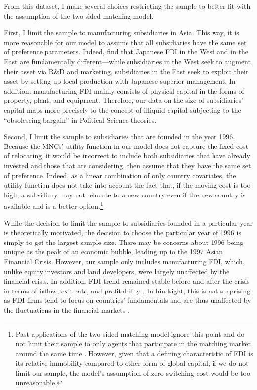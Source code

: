 From this dataset, I make several choices restricting the sample to better fit
with the assumption of the two-sided matching model.

First, I limit the sample to manufacturing subsidiaries in Asia. This way, it is
more reasonable
for our model to assume
that all subsidiaries have the same set of preference parameters. Indeed,
\citet{Pak2005} find that Japanese FDI in the West and in the East are
fundamentally different---while subsidiaries in the West seek
to augment their asset via R\&D and marketing, subsidiaries in the East seek to exploit their
asset by setting up local production with Japanese superior management. In addition, manufacturing FDI mainly
consists of physical capital in the forms of property, plant, and equipment.
Therefore, our data on the size of subsidiaries' capital maps more precisely to the
concept of illiquid capital subjecting to the ``obsolescing bargain'' in
Political Science theories.

Second, I limit the sample to subsidiaries that are founded in the year 1996. Because the MNCs'
utility function in our model does not capture the fixed cost of relocating, it
would be incorrect to include both subsidiaries that have already invested and
those that are considering, then assume that they have the same set of preference.
Indeed, as a linear combination of only country covariates, the utility function
does not take into account the fact that, if the moving cost is too high, a
subsidiary may not relocate to a new country even if the new country is
available and is a better option.\footnote{Past
applications of the two-sided matching model ignore this point and do not limit
their sample to only agents that participate in the matching market around
the same time \citep{Logan1996, Logan2008}. However, given that a defining
characteristic of FDI is its relative immobility compared to other form of
global capital, if we do not limit our sample, the model's assumption of zero switching cost would be too
unreasonable.}

While the decision to limit the sample to subsidiaries founded in a particular
year is theoretically motivated, the decision to choose the particular year of
1996 is simply to get the largest sample size. There may be concerns about 1996
being unique as the peak of an economic bubble, leading up to the 1997 Asian Financial Crisis.
However, our sample only includes manufacturing FDI, which, unlike equity
investors and land developers, were largely unaffected by the financial crisis.
In addition, FDI trend remained stable before and after the crisis in terms of
inflow, exit rate, and profitability \citep{Delios2001, UNCTAD1998}. In
hindsight, this is not surprising as FDI firms tend to focus on countries' fundamentals
and are thus unaffected by the fluctuations in the financial markets
\citep{Ahlquist2006}.

